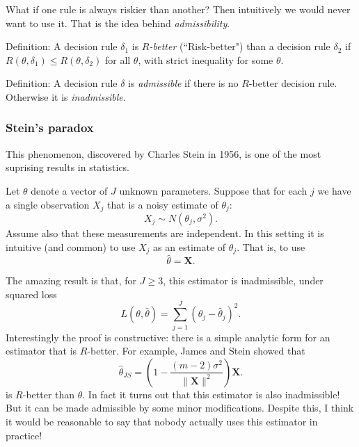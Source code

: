 \documentclass[12pt]{article}
\begin{document}
What if one rule is always riskier than another? Then intuitively we would
never want to use it. That is the idea behind {\it admissibility}.

\medskip
Definition:  A decision rule $\delta_1$ is {\it $R$-better} (``Risk-better") than
a decision rule $\delta_2$ if $R(\theta,\delta_1) \leq R(\theta,\delta_2)$ for all $\theta$, with strict inequality for some $\theta$.

\medskip
Definition: A decision rule $\delta$ is {\it admissible} if there is no $R$-better decision rule. Otherwise it is {\it inadmissible}.


\subsubsection*{Stein's paradox}

This phenomenon, discovered by Charles Stein in 1956, is one of the most suprising results in statistics.

Let $\theta$ denote a vector of $J$ unknown parameters. Suppose that for each $j$ we have a single observation $X_j$ that is a noisy estimate of $\theta_j$:
\begin{equation}
X_j \sim N(\theta_j, \sigma^2).
\end{equation}
Assume also that these measurements are independent. In this setting it is intuitive (and common) to use $X_j$ as an estimate of $\theta_j$.
That is, to use
\begin{equation}
\hat{\theta} = \mathbf X.
\end{equation}

The amazing result is that, for $J \geq 3$, this estimator is inadmissible, under squared loss
\begin{equation}
L(\theta,\hat{\theta})  = \sum_{j=1}^J (\theta_j - \hat{\theta}_j)^2.
\end{equation}
Interestingly the proof is constructive: there is a simple analytic form for an estimator that is $R$-better.
For example, James and Stein showed that
\begin{equation} \label{eqn:js}
\hat{\theta}_{JS} =  \left( 1 - \frac{(m-2) \sigma^2}{\|{\mathbf X}\|^2} \right) \mathbf X.
\end{equation}
is $R$-better than $\hat{\theta}$. In fact it turns out that this estimator is also inadmissible!
But it can be made admissible by some minor modifications.
Despite this, I think it would be reasonable to say that nobody actually uses this estimator in practice!
\end{document}
